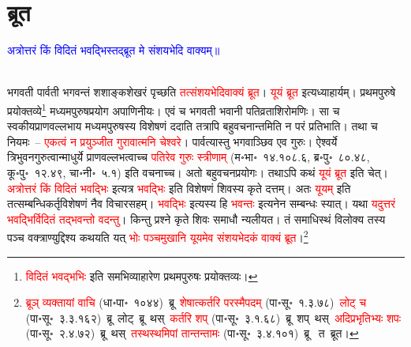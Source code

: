 \section[ब्रूत]{ब्रूत}
\centering\textcolor{blue}{अत्रोत्तरं किं विदितं भवद्भिस्तद्ब्रूत मे संशयभेदि वाक्यम्॥}\nopagebreak\\
\\
\fontsize{14}{21}\selectfont\begin{sloppypar}\justifying\noindent\hspace{10mm} भगवती पार्वती भगवन्तं शशाङ्क\-शेखरं पृच्छति \textcolor{red}{तत्संशय\-भेदि\-वाक्यं ब्रूत}। \textcolor{red}{यूयं ब्रूत} इत्यध्याहार्यम्। प्रथमपुरुषे प्रयोक्तव्ये\footnote{\textcolor{red}{विदितं भवद्भभिः} इति समभि\-व्याहारेण प्रथमपुरुषः प्रयोक्तव्यः।} मध्यम\-पुरुष\-प्रयोग अपाणिनीयः। एवं च भगवती भवानी पतिव्रता\-शिरोमणिः। सा च स्वकीय\-प्राण\-वल्लभाय मध्यम\-पुरुषस्य विशेषणं ददाति तत्रापि बहुवचनान्तमिति न परं प्रतिभाति। तथा च नियमः~– \textcolor{red}{एकत्वं न प्रयुञ्जीत गुरावात्मनि चेश्वरे}। पार्वत्यास्तु भगवाञ्छिव एव गुरुः। ऐश्वर्ये त्रिभुवन\-गुरुत्वान्माधुर्ये प्राण\-वल्लभत्वाच्च \textcolor{red}{पतिरेव गुरुः स्त्रीणाम्} (म॰भा॰~१४.१०८.६, ब्र॰पु॰~८०.४८, कू॰पु॰~१२.४९, चा॰नी॰~५.१) इति वचनाच्च। अतो बहुवचन\-प्रयोगः। तथाऽपि कथं \textcolor{red}{यूयं ब्रूत} इति चेत्। \textcolor{red}{अत्रोत्तरं किं विदितं भवद्भिः} इत्यत्र \textcolor{red}{भवद्भिः} इति विशेषणं शिवस्य कृते दत्तम्। अतः \textcolor{red}{यूयम्} इति तत्सम्बन्धि\-कर्तृ\-विशेषणं नैव विचारसहम्। \textcolor{red}{भवद्भिः} इत्यस्य हि \textcolor{red}{भवन्तः} इत्यनेन सम्बन्धः स्यात्। यथा \textcolor{red}{यदुत्तरं भवद्भिर्विदितं तद्भवन्तो वदन्तु}। किन्तु प्रश्ने कृते शिवः समाधौ न्यलीयत। तं समाधिस्थं विलोक्य तस्य पञ्च वक्त्राण्युद्दिश्य कथयति यत् \textcolor{red}{भोः पञ्च\-मुखानि यूयमेव संशय\-भेदकं वाक्यं ब्रूत}।\footnote{\textcolor{red}{ब्रूञ् व्यक्तायां वाचि} (धा॰पा॰~१०४४)~\arrow ब्रू~\arrow \textcolor{red}{शेषात्कर्तरि परस्मैपदम्} (पा॰सू॰~१.३.७८)~\arrow \textcolor{red}{लोट् च} (पा॰सू॰~३.३.१६२)~\arrow ब्रू~लोट्~\arrow ब्रू~थस्~\arrow \textcolor{red}{कर्तरि शप्} (पा॰सू॰~३.१.६८)~\arrow ब्रू~शप्~थस्~\arrow \textcolor{red}{अदिप्रभृतिभ्यः शपः} (पा॰सू॰~२.४.७२)~\arrow ब्रू~थस्~\arrow \textcolor{red}{तस्थस्थमिपां तान्तन्तामः} (पा॰सू॰~३.४.१०१)~\arrow ब्रू~ त~\arrow ब्रूत।}\end{sloppypar}
